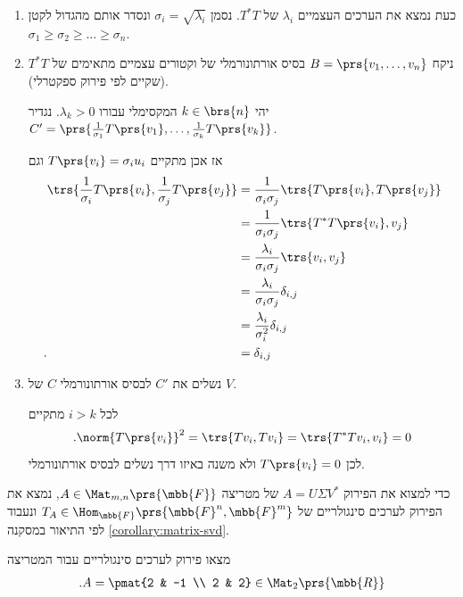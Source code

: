 \documentclass[a4paper,10pt,twoside,openany]{book}
\begin{document}
\begin{enumerate}
\item
כעת נמצא את הערכים העצמיים $\lambda_i$ של $T^* T$. נסמן
$\sigma_i = \sqrt{\lambda_i}$
ונסדר אותם מהגדול לקטן
$\sigma_1 \geq \sigma_2 \geq \ldots \geq \sigma_n$.

\item
ניקח
$B = \prs{v_1, \ldots, v_n}$
בסיס אורתונורמלי של וקטורים עצמיים מתאימים של
$T^* T$
(שקיים לפי פירוק ספקטרלי).

יהי
$k \in \brs{n}$
המקסימלי עבורו
$\lambda_k > 0$.
נגדיר
$C' = \prs{\frac{1}{\sigma_1} T\prs{v_1}, \ldots, \frac{1}{\sigma_k} T\prs{v_k}}$.

אז אכן מתקיים
$T\prs{v_i} = \sigma_i u_i$
וגם
\begin{align*}
\trs{\frac{1}{\sigma_i} T\prs{v_i}, \frac{1}{\sigma_j} T\prs{v_j}}
&=
\frac{1}{\sigma_i \sigma_j} \trs{T\prs{v_i}, T\prs{v_j}}
\\&=
\frac{1}{\sigma_i \sigma_j} \trs{T^* T\prs{v_i}, v_j}
\\&=
\frac{\lambda_i}{\sigma_i \sigma_j} \trs{v_i, v_j}
\\&=
\frac{\lambda_i}{\sigma_i \sigma_j} \delta_{i,j}
\\&=
\frac{\lambda_i}{\sigma_i^2} \delta_{i,j}
\\ \text{.} \hphantom{\trs{\frac{1}{\sigma_i} T\prs{v_i}, \frac{1}{\sigma_j} T\prs{v_j}}} &=
\delta_{i,j}
\end{align*}

\item
נשלים את
$C'$
לבסיס אורתונורמלי
$C$
של
$V$.

לכל
$i > k$
מתקיים
\[\text{.} \norm{T\prs{v_i}}^2 = \trs{Tv_i, Tv_i} = \trs{T^* T v_i, v_i} = 0\]
לכן
$T\prs{v_i} = 0$
ולא משנה באיזו דרך נשלים לבסיס אורתונורמלי.
\end{enumerate}

\begin{remark}
כדי למצוא את הפירוק
$A = U \Sigma V^*$
של מטריצה
$A \in \Mat_{m,n}\prs{\mbb{F}}$,
נמצא את הפירוק לערכים סינגולריים של
$T_A \in \Hom_{\mbb{F}}\prs{\mbb{F}^n, \mbb{F}^m}$
ונעבוד לפי התיאור במסקנה
\ref{corollary:matrix-svd}.
\end{remark}

\begin{exercisechap}
מצאו פירוק לערכים סינגולריים עבור המטריצה
\begin{align*}
\text{.} A = \pmat{2 & -1 \\ 2 & 2} \in \Mat_2\prs{\mbb{R}}
\end{align*}
\end{exercisechap}
\end{document}
